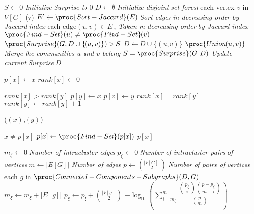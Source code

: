 \begin{small}
\begin{codebox}
\li $S\gets 0$ \Comment \emph{Initialize Surprise to $0$}
\li $D \gets \emptyset$ \Comment \emph{Initialize disjoint set forest}
\li \For each vertex $v$ in $V[G]$
\li \Do {}(v)
\End
\li $E' \gets \proc{Sort-Jaccard}(E)$ \Comment \emph{Sort edges in decreasing order by Jaccard index}
\li \For each edge$(u,v) \in E'$, \Comment \emph{Taken in decreasing order by Jaccard index}
\li \Do \If $\proc{Find-Set}(u) \neq \proc{Find-Set}(v)$
\li \Then \If $\proc{Surprise}(G,D \cup \{ (u,v)\} ) > S$
\li $D \gets D \cup  \{(u,v)\}$
\li $\proc{Union(u,v)}$ \Comment\emph{Merge the communities $u$ and $v$ belong}
\li $S=\proc{Surprise}(G,D)$ \Comment \emph{Update current Surprise}
\End
\End
\li
\Return $D$
\end{codebox}

\begin{codebox}
\li $p[x] \gets x$
\li $rank[x] \gets 0$
\end{codebox}
\begin{codebox}
\li \If $rank[x]>rank[y]$
\li \Then $p[y]\gets x$
\li \Else $p[x]\gets y$
\li \If $rank[x] = rank[y]$
\li \Then $rank[y] \gets rank[y]+1$
\End
\End
\end{codebox}
\begin{codebox}
\li {}($(x)$,$(y)$)
\end{codebox}
\begin{codebox}
\li \If $x\neq p[x]$
\li \Then $p[x] \gets \proc{Find-Set}(p[x])$
\End
\li\Return $p[x]$
\end{codebox}
\begin{codebox}
\li $m_{\xi} \gets 0$ \Comment \emph{Number of intracluster edges}
\li $p_{\xi} \gets 0$ \Comment \emph{Number of intracluster pairs of vertices}
\li $m \gets |E[G]|$ \Comment \emph{Number of edges}
\li $p \gets \binom{\left| V[G]\right|}{2}$ \Comment \emph{Number of pairs of vertices}
\li \For each $g$ in $\proc{Connected-Components-Subgraphs}(D,G)$
\li \Do $m_{\xi} \gets m_{\xi} + \left|E[g]\right|$
\li $p_{\xi} \gets p_{\xi} + \binom{\left| V[g]\right|}{2}$
\End
\li \Return $-\log_{10}\left( \sum \limits_{i=m_\zeta}^m \dfrac{\binom{p_\xi}{i}\binom{p-p_{\xi}}{m-i}}{\binom{p}{m}} \right)$
\end{codebox}
\end{small}